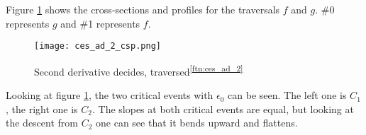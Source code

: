 	
	Figure \ref{fig:ces_ad_2_csp} shows the cross-sections and profiles for the traversals $f$ and $g$. \#0 represents $g$ and \#1 represents $f$.
	

\begin{figure}[H]
	\centering
    
    \texttt{[image: ces\_ad\_2\_csp.png]}
		
	\caption{Second derivative decides, traversed\textsuperscript{\ref{ftn:ces_ad_2}}}
    \label{fig:ces_ad_2_csp}
\end{figure}
	
	Looking at figure \ref{fig:ces_ad_2_csp}, the two critical events with $\epsilon_0$ can be seen. The left one is $C_1$, the right one is $C_2$. The slopes at both critical events are equal, but looking at the descent from $C_2$ one can see that it bends upward and flattens.


